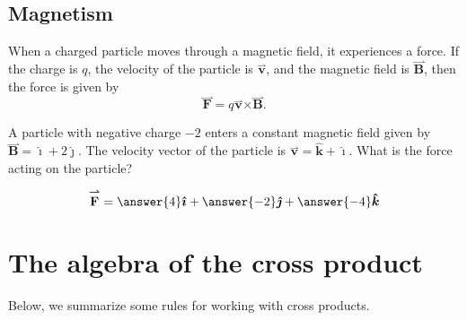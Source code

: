 \documentclass{ximera}
\begin{document}
\subsection{Magnetism} 

When a charged particle moves through a magnetic field, it experiences
a force.  If the charge is $q$, the velocity of the particle is
$\overset{\boldsymbol{\rightharpoonup}}{\mathbf{v}}$, and the magnetic field is $\overset{\boldsymbol{\rightharpoonup}}{\mathbf{B}}$, then the force is
given by
\[
\overset{\boldsymbol{\rightharpoonup}}{\mathbf{F}} = q \overset{\boldsymbol{\rightharpoonup}}{\mathbf{v}} \boldsymbol\times \overset{\boldsymbol{\rightharpoonup}}{\mathbf{B}}.
\]

\begin{question}
  A particle with negative charge $-2$ enters a constant magnetic
  field given by $\overset{\boldsymbol{\rightharpoonup}}{\mathbf{B}} = \boldsymbol{\hat{\imath}}+2\boldsymbol{\hat{\jmath}}$.  The velocity vector of
  the particle is $\overset{\boldsymbol{\rightharpoonup}}{\mathbf{v}} = \boldsymbol{\hat{k}}+\boldsymbol{\hat{\imath}}$.  What is the force
  acting on the particle?
  \begin{prompt}
  \[
  \overset{\boldsymbol{\rightharpoonup}}{\mathbf{F}} = \answer{4}\boldsymbol{\hat{\imath}}+\answer{-2}\boldsymbol{\hat{\jmath}}+\answer{-4}\boldsymbol{\hat{k}}
  \]
  \end{prompt}
\end{question}







\section{The algebra of the cross product}


Below, we summarize some rules for working with cross products.
\end{document}
